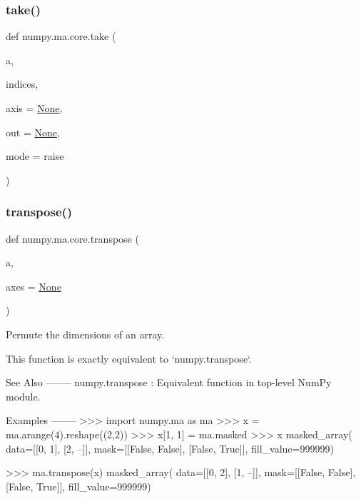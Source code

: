 \subsubsection{\texorpdfstring{take()}{take()}}
{\footnotesize\ttfamily def numpy.\+ma.\+core.\+take (\begin{DoxyParamCaption}\item[{}]{a,  }\item[{}]{indices,  }\item[{}]{axis = {\ttfamily \hyperlink{namespacenumpy_1_1ma_1_1core_a647ee1848dfa3692fe35a663a2aa40b3}{None}},  }\item[{}]{out = {\ttfamily \hyperlink{namespacenumpy_1_1ma_1_1core_a647ee1848dfa3692fe35a663a2aa40b3}{None}},  }\item[{}]{mode = {\ttfamily \textquotesingle{}raise\textquotesingle{}} }\end{DoxyParamCaption})}

\begin{DoxyVerb}\end{DoxyVerb}
 \mbox{\label{namespacenumpy_1_1ma_1_1core_a20525945e912d4049c170965fc404ed4}} 
\subsubsection{\texorpdfstring{transpose()}{transpose()}}
{\footnotesize\ttfamily def numpy.\+ma.\+core.\+transpose (\begin{DoxyParamCaption}\item[{}]{a,  }\item[{}]{axes = {\ttfamily \hyperlink{namespacenumpy_1_1ma_1_1core_a647ee1848dfa3692fe35a663a2aa40b3}{None}} }\end{DoxyParamCaption})}

\begin{DoxyVerb}Permute the dimensions of an array.

This function is exactly equivalent to `numpy.transpose`.

See Also
--------
numpy.transpose : Equivalent function in top-level NumPy module.

Examples
--------
>>> import numpy.ma as ma
>>> x = ma.arange(4).reshape((2,2))
>>> x[1, 1] = ma.masked
>>> x
masked_array(
  data=[[0, 1],
        [2, --]],
  mask=[[False, False],
        [False,  True]],
  fill_value=999999)

>>> ma.transpose(x)
masked_array(
  data=[[0, 2],
        [1, --]],
  mask=[[False, False],
        [False,  True]],
  fill_value=999999)
\end{DoxyVerb}
 \mbox{\label{namespacenumpy_1_1ma_1_1core_ab04bf9c9c7ae045e3b334cb1962486e6}} 
